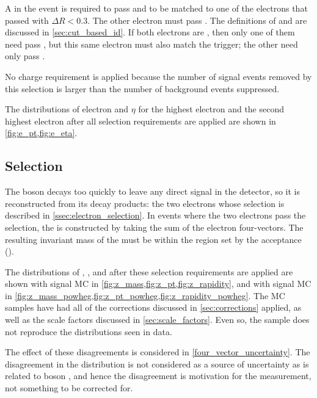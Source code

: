 A \CentralElectron in the event is required to pass \EGTIGHT and to be matched
to one of the electrons that passed \SingleElectronTrigger with $\Delta R <
0.3$. The other electron must pass \EGMEDIUM. The definitions of \EGMEDIUM and
\EGTIGHT are discussed in \cref{sec:cut_based_id}. If both electrons are
\CentralElectrons, then only one of them need pass \EGTIGHT, but this same
electron must also match the trigger; the other \CentralElectron need only pass
\EGMEDIUM.

No charge requirement is applied because the number of signal events removed by
this selection is larger than the number of background events suppressed.

The distributions of electron \pt and $\eta$ for the highest \pt electron and
the second highest \pt electron after all selection requirements are applied
are shown in \cref{fig:e_pt,fig:e_eta}.




\subsection{\Z Selection}

The \Z boson decays too quickly to leave any direct signal in the detector, so
it is reconstructed from its decay products: the two electrons whose selection
is described in \cref{ssec:electron_selection}. In events where the two
electrons pass the selection, the \Z is constructed by taking the sum of the
electron four-vectors. The resulting invariant mass of the \Z must be within
the region set by the acceptance (\MassRange).

The distributions of \mee, \Z \bosonpt, and \Z \rapidity after these selection
requirements are applied are shown with \MADGRAPH signal MC in
\cref{fig:z_mass,fig:z_pt,fig:z_rapidity}, and with \PPsixZtwo signal MC in
\cref{fig:z_mass_powheg,fig:z_pt_powheg,fig:z_rapidity_powheg}. The MC samples
have had all of the corrections discussed in \cref{sec:corrections} applied, as
well as the scale factors discussed in \cref{sec:scale_factors}. Even so, the
\MADGRAPH sample does not reproduce the distributions seen in data.

The effect of these disagreements is considered in
\cref{four_vector_uncertainty}. The disagreement in the \Z \bosonpt
distribution is not considered as a source of uncertainty as \phistar is
related to boson \bosonpt, and hence the disagreement is motivation for the
measurement, not something to be corrected for.

